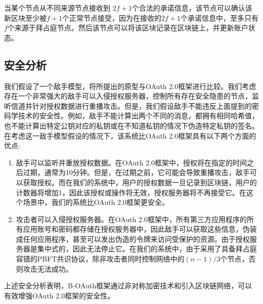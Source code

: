 当某个节点从不同来源节点接收到 $2f+1$个合法的承诺信息，该节点可以确认该新区块至少被$f+1$个正常节点接受，因为在接收的$2f+1$个承诺信息中，至多只有$f$个来源于拜占庭节点。然后该节点可以将该区块记录在区块链上，并更新账户状态。

\subsection{安全分析}

我们假设了一个敌手模型，将所提出的原型与OAuth 2.0框架进行比较。我们考虑存在一个非常强大的敌手可以入侵授权服务器，控制所有存在安全隐患的节点，监听信道并针对授权数据进行重播攻击。但是，我们假设敌手不能违反上面提到的密码学技术的安全性。例如，敌手不能计算出两个不同的消息，都拥有相同哈希值，也不能计算出特定公钥对应的私钥或在不知道私钥的情况下伪造特定私钥的签名。在考虑这一敌手模型假设的情况下，该系统比OAuth 2.0框架具有以下两个方面的优点:

\begin{enumerate}
  \item 敌手可以监听并重放授权数据。在OAuth 2.0框架中，授权将在指定的时间之后过期，通常为10分钟。但是，在过期之前，它可能会导致重播攻击，敌手可以获取授权。而在我们的系统中，用户的授权数据一旦记录到区块链，用户的计数器将增加1，因此该授权或操作将无效，授权服务器将不再接受它。在这个场景中，我们的系统比OAuth 2.0框架更安全。

  \item 攻击者可以入侵授权服务器。在OAuth 2.0框架中，所有第三方应用程序的所有应用账号和密码都存储在授权服务器中，因此敌手可以获取这些信息，伪装成任何应用程序，甚至可以发出伪造的令牌来访问受保护的资源。由于授权服务器是集中式的，因此无法停止它。在我们的系统中，由于采用了具备拜占庭容错的PBFT共识协议，除非攻击者同时控制网络中的$(n-1)/3$个节点，否则攻击无法成功。
\end{enumerate}

上述安全分析表明，B-OAuth框架通过非对称加密技术和引入区块链网络，可以有效增强OAuth 2.0框架的安全性。